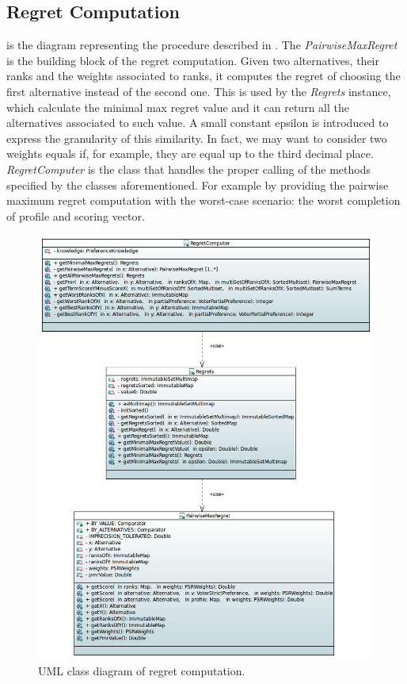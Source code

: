 \pagebreak

\subsection{Regret Computation}
 is the diagram representing the procedure described in . The \textit{PairwiseMaxRegret} is the building block of the regret computation. Given two alternatives, their ranks and the weights associated to ranks, it computes the regret of choosing the first alternative instead of the second one. This is used by the \textit{Regrets} instance, which calculate the minimal max regret value and it can return all the alternatives associated to such value. A small constant epsilon is introduced to express the granularity of this similarity. In fact, we may want to consider two weights equals if, for example, they are equal up to the third decimal place. \textit{RegretComputer} is the class that handles the proper calling of the methods specified by the classes aforementioned. For example by providing the pairwise maximum regret computation with the worst-case scenario: the worst completion of profile and scoring vector.


\begin{figure}
	\centering
	\includegraphics[width=\textwidth]{uml/regret.jpeg}
	\caption{UML class diagram of regret computation.}
	\label{uml:regret}
\end{figure}


